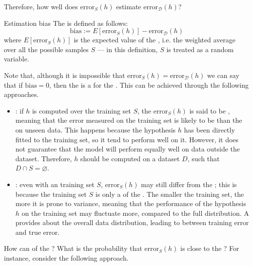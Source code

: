 \documentclass[a4paper, 12pt]{report}
\begin{document}
    Therefore, how well does $\mathrm{error}_S(h)$ estimate $\mathrm{error}_\mathcal D(h)$?

    \begin{frameddefn}{Estimation bias}
        The  is defined as follows: $$\mathrm{bias} := E[\mathrm{error}_S(h)] - \mathrm{error}_\mathcal D(h)$$ where $E[\mathrm{error}_S(h)]$ is the expected value of the , i.e. the weighted average over all the possible samples $S$ --- in this definition, $S$ is treated as a random variable.
    \end{frameddefn}

    Note that, although it is impossible that $\mathrm{error}_S(h) = \mathrm{error}_\mathcal D(h)$ we can say that if $\mathrm{bias} = 0$, then the  is a  for the . This can be achieved through the following approaches.

    \begin{itemize}
        \item {}: if $h$ is computed over the training set $S$, the $\mathrm{error}_S(h)$ is said to be , meaning that the error measured on the training set is likely to be  than the  on unseen data. This happens because the hypothesis $h$ has been directly fitted to the training set, so it tend to perform well on it. However, it does not guarantee that the model will perform equally well on data outside the dataset. Therefore, $h$ should be computed on a dataset $D$, such that $D \cap S = \varnothing$.
        \item {}: even with an  training set $S$, $\mathrm{error}_S(h)$ may still differ from the ; this is because the training set $S$ is only a  of the . The smaller the training set, the more it is prone to variance, meaning that the performance of the hypothesis $h$ on the training set may fluctuate more, compared to the full distribution. A  provides  about the overall data distribution, leading to  between training error and true error.
    \end{itemize}

    How can  of the ? What is the probability that $\mathrm{error}_S(h)$ is close to the ? For instance, consider the following approach.
\end{document}
